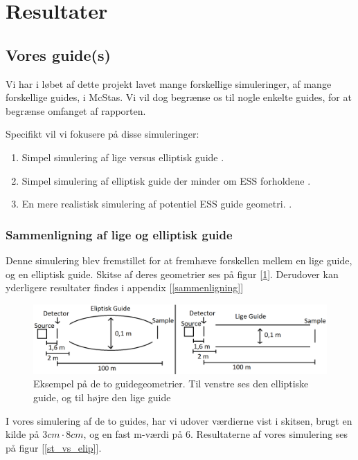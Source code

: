 \documentclass[12pt,oneside,a4paper]{article}
\begin{document}
{{{{{\section{Resultater}

\subsection{Vores guide(s)}
Vi har i løbet af dette projekt lavet mange forskellige simuleringer, af mange forskellige guides, i McStas. Vi vil dog begrænse os til nogle enkelte guides, for at begrænse omfanget af rapporten.

Specifikt vil vi fokusere på disse simuleringer:
\begin{enumerate}
    \item Simpel simulering af lige versus elliptisk guide \cite{github:st_vs_el}.
    \item Simpel simulering af elliptisk guide der minder om ESS forholdene \cite{github:ess_sim_simple}.
    \item En mere realistisk simulering af potentiel ESS guide geometri. \cite{github:ess_brill_optimized}.
\end{enumerate}

\subsubsection{Sammenligning af lige og elliptisk guide}
Denne simulering blev fremstillet for at fremhæve forskellen mellem en lige guide, og en elliptisk guide. Skitse af deres geometrier ses på figur [\ref{lige_mod_eliptisk}]. Derudover kan yderligere resultater findes i appendix [\ref{sammenligning}]

\begin{figure}[H] 
\centering
\includegraphics[width=1\textwidth]{Straight_VS_Elipse.png}
\caption{Eksempel på de to guidegeometrier. Til venstre ses den elliptiske guide, og til højre den lige guide} \label{lige_mod_eliptisk}
\end{figure}

I vores simulering af de to guides, har vi udover værdierne vist i skitsen, brugt en kilde på $3cm\cdot8cm$, og en fast m-værdi på 6. Resultaterne af vores simulering ses på figur [\ref{st_vs_elip}].

}}}}}
\end{document}
